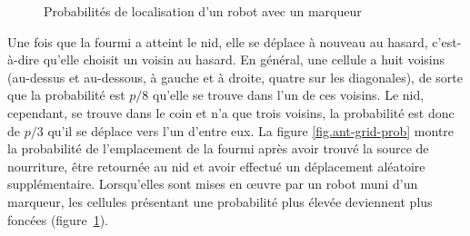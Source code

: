 \begin{figure}
\begin{center}
\end{center}
\caption{Probabilités de localisation d'un robot avec un marqueur}\label{fig.ant-grid-gray}
\end{figure}

Une fois que la fourmi a atteint le nid, elle se déplace à nouveau au hasard, c'est-à-dire qu'elle choisit un voisin au hasard. En général, une cellule a huit voisins (au-dessus et au-dessous, à gauche et à droite, quatre sur les diagonales), de sorte que la probabilité est $p/8$ qu'elle se trouve dans l'un de ces voisins. Le nid, cependant, se trouve dans le coin et n'a que trois voisins, la probabilité est donc de $p/3$ qu'il se déplace vers l'un d'entre eux. La figure \ref{fig.ant-grid-prob} montre la probabilité de l'emplacement de la fourmi après avoir trouvé la source de nourriture, être retournée au nid et avoir effectué un déplacement aléatoire supplémentaire. Lorsqu'elles sont mises en œuvre par un robot muni d'un marqueur, les cellules présentant une probabilité plus élevée deviennent plus foncées (figure~\ref{fig.ant-grid-gray}).


